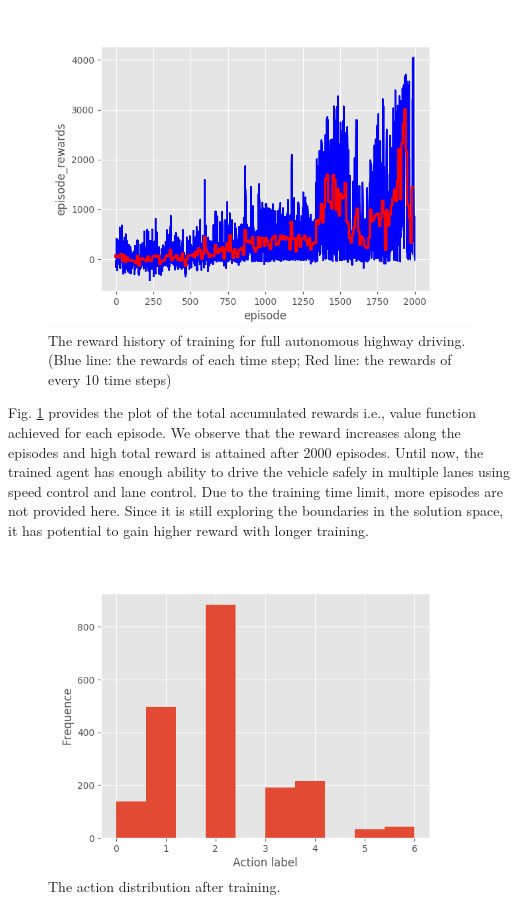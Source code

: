 \begin{figure}[h]
\centering
\includegraphics[width=1.0\textwidth]{figs/ch5/auto-reward}
\caption{The reward history of training for full autonomous highway driving. (Blue line: the rewards of each time step; Red line: the rewards of every 10 time steps)}
\label{fig:auto}
\end{figure}

Fig. \ref{fig:auto} provides the plot of the total accumulated rewards i.e., value function achieved for each episode. We observe that the reward increases along the episodes and high total reward is attained after 2000 episodes. Until now, the trained agent has enough ability to drive the vehicle safely in multiple lanes using speed control and lane control. Due to the training time limit, more episodes are not provided here. Since it is still exploring the boundaries in the solution space, it has potential to gain higher reward with longer training.

\begin{figure}[h]
\centering
\includegraphics[width=1.0\textwidth]{figs/ch5/auto_action_distribution}
\caption{The action distribution after training.}
\label{fig:auto-action}
\end{figure}


